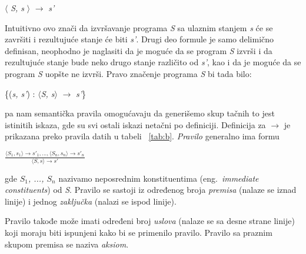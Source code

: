 \documentclass[a4paper]{article}
\begin{document}
{\begin{center}$\langle$ \textit{S, s} $\rangle$ $\rightarrow$ \textit{s'} \end{center}
Intuitivno ovo znači da izvršavanje programa \textit{S} sa ulaznim stanjem \textit{s} će se završiti i rezultujuće stanje će biti \textit{s'}. Drugi deo formule je samo delimično definisan, neophodno je naglasiti da je moguće da se program \textit{S} izvrši i da rezultujuće stanje bude neko drugo stanje različito od \textit{s'}, kao i da je moguće da se program \textit{S} uopšte ne izvrši. Pravo značenje programa \textit{S} bi tada bilo:
\begin{center}\{(\textit{s, s'}) : $\langle$\textit{S, s}$\rangle$ $\rightarrow$ \textit{s'}\} \end{center} 
pa nam semantička pravila omogućavaju da generišemo skup tačnih to jest istinitih iskaza, gde su svi ostali iskazi netačni po definiciji.\cite{opersem}
Definicija za $\rightarrow$ je prikazana preko pravila datih u tabeli ~\ref{tab:b}. \textit{Pravilo} generalno ima formu

{\large \begin{center}$\frac{\langle S_1, s_1 \rangle \rightarrow s'_1, ... , \langle S_n, s_n \rangle \rightarrow s'_n}{\langle S, s \rangle \rightarrow s'}$ \end{center}}

gde \textit{$S_1$, ..., $S_n$} nazivamo neposrednim konstituentima (eng.~{\em immediate constituents}) od \textit{S}. Pravilo se sastoji iz određenog broja \textit{premisa} (nalaze se iznad linije) i jednog \textit{zaključka} (nalazi se ispod linije).

Pravilo takođe može imati određeni broj \textit{uslova} (nalaze se sa desne strane linije) koji moraju biti ispunjeni kako bi se primenilo pravilo. Pravilo sa praznim skupom premisa se naziva \textit{aksiom}. \cite{willey}

}
\end{document}
